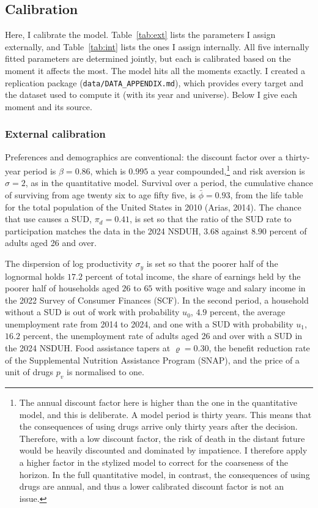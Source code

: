 \documentclass[10pt]{article}
\begin{document}
\subsection{Calibration}\label{sec:cal}

  Here, I calibrate the model. Table~\ref{tab:ext} lists the parameters I assign externally, and Table~\ref{tab:int} lists the ones I assign internally. All five internally fitted parameters are determined jointly, but each is calibrated based on the moment it affects the most. The model hits all the moments exactly. I created a replication package (\texttt{data/DATA\_APPENDIX.md}), which provides every target and the dataset used to compute it (with its year and universe). Below I give each moment and its source.

\subsubsection{External calibration}

Preferences and demographics are conventional: the discount factor over a
thirty-year period is $\beta=0.86$, which is $0.995$ a year compounded,\footnote{The annual discount factor here is higher than the one in the
quantitative model, and this is deliberate.    A model period is thirty years. This means that the consequences of using drugs arrive only thirty years after the decision. Therefore, with a low discount factor, the risk of death in the distant future would be heavily discounted and dominated by impatience. I therefore apply a higher factor in the stylized model to correct for the coarseness of the horizon. In the full quantitative model, in contrast, the consequences of using drugs are annual, and thus a lower calibrated discount factor is not an issue.} and risk aversion is
$\sigma=2$, as in the quantitative model. Survival over a period, the cumulative chance of surviving from age twenty six to age fifty five, is
$\bar\phi = 0.93$, from the life table for the total population of the United States in 2010
(Arias, 2014). The chance that use causes a SUD, $\pi_d=0.41$, is set so that the ratio of the SUD rate to participation matches the data in the 2024 NSDUH, $3.68$ against $8.90$ percent of adults aged 26 and over.

The dispersion of log productivity $\sigma_y$ is set so that the poorer half of the lognormal holds $17.2$ percent of total income, the share of earnings held by the poorer half of households aged $26$ to $65$ with positive wage and salary income in the 2022 Survey of Consumer Finances (SCF). In the second period, a household without a SUD is out of work with probability $u_0$, $4.9$ percent, the average unemployment rate from 2014 to 2024, and one with a SUD with probability $u_1$, $16.2$ percent, the unemployment rate of adults aged 26 and over with a SUD in the 2024 NSDUH. Food assistance tapers at $\varrho=0.30$, the benefit reduction rate of the Supplemental Nutrition Assistance Program (SNAP), and the price of a unit of drugs $p_v$ is normalised to one.
\end{document}
